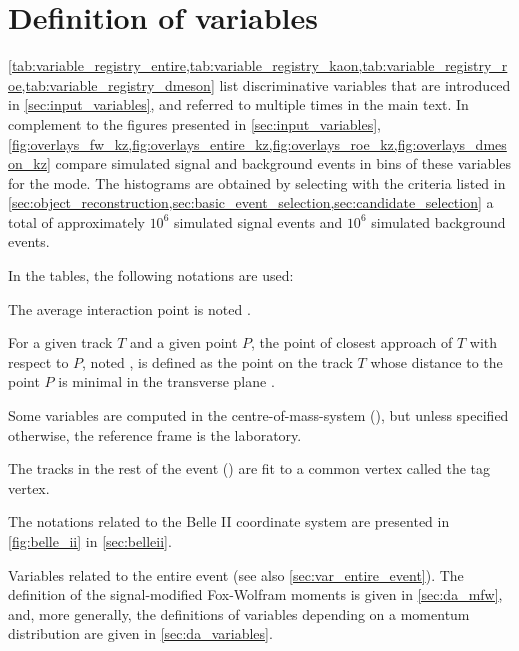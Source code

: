 \section{Definition of variables} \label{sec:app_variable_definition}

\cref{tab:variable_registry_entire,tab:variable_registry_kaon,tab:variable_registry_roe,tab:variable_registry_dmeson} list discriminative variables that are introduced in \cref{sec:input_variables}, and referred to multiple times in the main text.
In complement to the figures presented in \cref{sec:input_variables}, \cref{fig:overlays_fw_kz,fig:overlays_entire_kz,fig:overlays_roe_kz,fig:overlays_dmeson_kz} compare simulated signal and background events in bins of these variables for the \BKznn mode.
The histograms are obtained by selecting with the criteria listed in \cref{sec:object_reconstruction,sec:basic_event_selection,sec:candidate_selection} a total of approximately $10^6$ simulated signal events and $10^6$ simulated background events.

In the tables, the following notations are used:
\bi
\item The average interaction point is noted \IP.
\item For a given track $T$ and a given point $P$, the point of closest approach of $T$ with respect to $P$, noted \POCA, is defined as the point on the track $T$ whose distance to the point $P$ is minimal in the transverse plane \cite{Bertacchi2021}.
\item Some variables are computed in the centre-of-mass-system (\CMS), but unless specified otherwise, the reference frame is the laboratory.
\item The tracks in the rest of the event (\ROE) are fit to a common vertex called the tag vertex.
\item The notations related to the Belle II coordinate system are presented in \cref{fig:belle_ii} in \cref{sec:belleii}.
\ei

{
Variables related to the entire event (see also \cref{sec:var_entire_event}).
The definition of the signal-\ROE modified Fox-Wolfram moments is given in \cref{sec:da_mfw}, and, more generally, the definitions of variables depending on a momentum distribution are given in \cref{sec:da_variables}.
}

